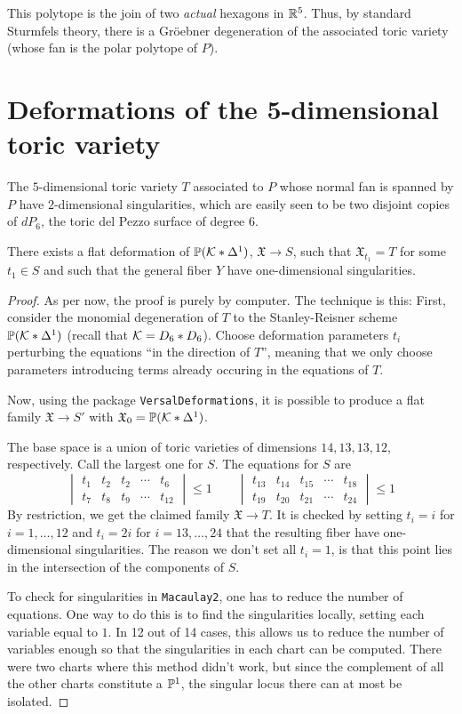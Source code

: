 \documentclass[11pt, english]{article}
\begin{document}
This polytope is the join of two \emph{actual} hexagons in $\mathbb{R}^5$. Thus, by standard Sturmfels theory, there is a Gröebner degeneration of the associated toric variety (whose fan is the polar polytope of $P$).

\section{Deformations of the 5-dimensional toric variety}

The $5$-dimensional toric variety $T$ associated to $P$ whose normal fan is spanned by $P$  have $2$-dimensional singularities, which are easily seen to be two disjoint copies of $dP_6$, the toric del Pezzo surface of degree $6$.

\begin{thm}
There exists a flat deformation of $\mathbb{P}(\mathcal K \ast \Delta^1)$, $\mathfrak X \to S$, such that $\mathfrak X_{t_1} = T$ for some $t_1 \in S$ and such that the general fiber $Y$ have one-dimensional singularities.
\end{thm}
\begin{proof}
 As per now, the proof is purely by computer. The technique is this: First, consider the monomial degeneration of $T$ to the Stanley-Reisner scheme $\mathbb{P}(\mathcal K \ast \Delta^1)$ (recall that $\mathcal K=D_6 \ast D_6$). Choose deformation parameters $t_i$ perturbing the equations ``in the direction of $T$'', meaning that we only choose parameters introducing terms already occuring in the equations of $T$.

Now, using the package \verb|VersalDeformations|, it is possible to produce a flat family $\mathfrak X \to S'$ with $\mathfrak X_0 = \mathbb{P}(\mathcal K \ast \Delta^1)$.

The base space is a union of toric varieties of dimensions $14,13,13,12$, respectively. Call the largest one for $S$. The equations for $S$ are 
\[
\begin{vmatrix}
 t_1 & t_2 & t_2 &  \cdots & t_{6} \\
 t_7 & t_8 &  t_9 & \cdots & t_{12} 
\end{vmatrix} \leq 1 \qquad 
\begin{vmatrix}
 t_{13} & t_{14} & t_{15} &  \cdots & t_{18} \\
 t_{19} & t_{20}  & t_{21} & \cdots & t_{24} 
\end{vmatrix} \leq 1 
\]
By restriction, we get the claimed family $\mathfrak X \to T$. It is checked by setting $t_i=i$ for $i=1,\ldots,12$ and $t_i=2i$ for $i=13,\ldots,24$ that the resulting fiber have one-dimensional singularities. The reason we don't set all $t_i=1$, is that this point lies in the intersection of the components of $S$.

To check for singularities in \verb|Macaulay2|, one has to reduce the number of equations. One way to do this is to find the singularities locally, setting each variable equal to $1$. In 12 out of 14 cases, this allows us to reduce the number of variables enough so that the singularities in each chart can be computed. There were two charts where this method didn't work, but since the complement of all the other charts constitute a $\mathbb{P}^1$, the singular locus there can at most be isolated.
\end{proof}
\end{document}
